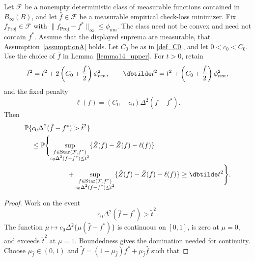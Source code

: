 \documentclass[twoside,11pt]{article}
\newenvironment{revision}{\color{revisionred}}{}
\begin{document}
\begin{revision}
\begin{corollary}
\label{cor:huber loss}
Let $\mathcal F$ be a nonempty deterministic class of measurable
functions contained in $B_\infty(B)$, and let $\hat f\in\mathcal F$
be a measurable empirical check-loss minimizer.
Fix $f_{\text{Proj}}\in\mathcal F$
with $\|f_{\text{Proj}}-f^*\|_\infty\leq\phi_{nm}$.
The class need not be convex and need not contain $f^*$.
Assume that the displayed suprema are measurable, that
Assumption~\ref{assumptionA} holds. Let $C_0$ be as in \eqref{def_C0},
and let $0<c_0<C_0$. Use the choice of $\bar f$ in
Lemma~\ref{lemma14_upper}. For $t>0$, retain
\begin{equation}
\label{tilde_tsqared}
\tilde t^2=t^2+2\left(C_0+\frac{\bar f}{2}\right)\phi_{nm}^2,
\qquad
\dbtilde t^2=t^2+\left(C_0+\frac{\bar f}{2}\right)\phi_{nm}^2,
\end{equation}
and the fixed penalty
\begin{equation}
\label{def_tilde_l}
\ell(f)=(C_0-c_0)\Delta^2(f-f^*).
\end{equation}
Then
\begin{equation}
\label{eq_nonconvex_boundary_probability}
\begin{aligned}
&\mathbb P\{c_0\Delta^2(\hat f-f^*)>\tilde t^2\}\\
&\quad\leq\mathbb P\Biggl\{
\sup_{\substack{f\in\operatorname{Star}(\mathcal F,f^*)\\
                 c_0\Delta^2(f-f^*)\leq\tilde t^2}}
       \{\bar Z(f)-\hat Z(f)-\ell(f)\}\\
&\hspace{62pt}+
\sup_{\substack{f\in\operatorname{Star}(\mathcal F,f^*)\\
                 c_0\Delta^2(f-f^*)\leq\tilde t^2}}
       \{\hat Z(f)-\bar Z(f)-\ell(f)\}
\geq\dbtilde t^2\Biggr\}.
\end{aligned}
\end{equation}
\end{corollary}
\begin{proof}
Work on the event
\begin{equation}
\label{tilde_t}
c_0\Delta^2(\hat f-f^*)>\tilde t^2.
\end{equation}
The function $\mu\mapsto c_0\Delta^2\{\mu(\hat f-f^*)\}$ is
continuous on $[0,1]$, is zero at $\mu=0$, and exceeds $\tilde t^2$
at $\mu=1$. Boundedness gives the domination needed for continuity.
Choose $\mu_{\hat f}\in(0,1)$ and
$\tilde f=(1-\mu_{\hat f})f^*+\mu_{\hat f}\hat f$ such that

\end{proof}
\end{revision}
\end{document}
